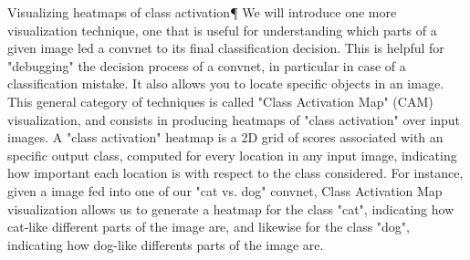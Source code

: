 Visualizing heatmaps of class activation¶
We will introduce one more visualization technique, one that is useful for understanding which parts of a given image led a convnet to its final classification decision. This is helpful for "debugging" the decision process of a convnet, in particular in case of a classification mistake. It also allows you to locate specific objects in an image.
This general category of techniques is called "Class Activation Map" (CAM) visualization, and consists in producing heatmaps of "class activation" over input images. A "class activation" heatmap is a 2D grid of scores associated with an specific output class, computed for every location in any input image, indicating how important each location is with respect to the class considered. For instance, given a image fed into one of our "cat vs. dog" convnet, Class Activation Map visualization allows us to generate a heatmap for the class "cat", indicating how cat-like different parts of the image are, and likewise for the class "dog", indicating how dog-like differents parts of the image are.